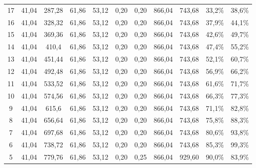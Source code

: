 \documentclass[letterpaper,11pt]{article} %
\begin{document}
\begin{itemize}
\begin{table}[H]
{\begin{tabular}{|c|cc|cc|cc|cc|cc|}
            17    & 41,04 & 287,28 & 61,86 & 53,12 & \cellcolor[rgb]{ .851,  .851,  .851}0,20 & \cellcolor[rgb]{ .851,  .851,  .851}0,20 & 866,04 & 743,68 & 33,2\% & 38,6\% \\
            16    & 41,04 & 328,32 & 61,86 & 53,12 & \cellcolor[rgb]{ .851,  .851,  .851}0,20 & \cellcolor[rgb]{ .851,  .851,  .851}0,20 & 866,04 & 743,68 & 37,9\% & 44,1\% \\
            15    & 41,04 & 369,36 & 61,86 & 53,12 & \cellcolor[rgb]{ .851,  .851,  .851}0,20 & \cellcolor[rgb]{ .851,  .851,  .851}0,20 & 866,04 & 743,68 & 42,6\% & 49,7\% \\
            14    & 41,04 & 410,4 & 61,86 & 53,12 & \cellcolor[rgb]{ .851,  .851,  .851}0,20 & \cellcolor[rgb]{ .851,  .851,  .851}0,20 & 866,04 & 743,68 & 47,4\% & 55,2\% \\
            13    & 41,04 & 451,44 & 61,86 & 53,12 & \cellcolor[rgb]{ .851,  .851,  .851}0,20 & \cellcolor[rgb]{ .851,  .851,  .851}0,20 & 866,04 & 743,68 & 52,1\% & 60,7\% \\
            12    & 41,04 & 492,48 & 61,86 & 53,12 & \cellcolor[rgb]{ .851,  .851,  .851}0,20 & \cellcolor[rgb]{ .851,  .851,  .851}0,20 & 866,04 & 743,68 & 56,9\% & 66,2\% \\
            11    & 41,04 & 533,52 & 61,86 & 53,12 & \cellcolor[rgb]{ .851,  .851,  .851}0,20 & \cellcolor[rgb]{ .851,  .851,  .851}0,20 & 866,04 & 743,68 & 61,6\% & 71,7\% \\
            10    & 41,04 & 574,56 & 61,86 & 53,12 & \cellcolor[rgb]{ .851,  .851,  .851}0,20 & \cellcolor[rgb]{ .851,  .851,  .851}0,20 & 866,04 & 743,68 & 66,3\% & 77,3\% \\
            9     & 41,04 & 615,6 & 61,86 & 53,12 & \cellcolor[rgb]{ .851,  .851,  .851}0,20 & \cellcolor[rgb]{ .851,  .851,  .851}0,20 & 866,04 & 743,68 & 71,1\% & 82,8\% \\
            8     & 41,04 & 656,64 & 61,86 & 53,12 & \cellcolor[rgb]{ .851,  .851,  .851}0,20 & \cellcolor[rgb]{ .851,  .851,  .851}0,20 & 866,04 & 743,68 & 75,8\% & 88,3\% \\
            7     & 41,04 & 697,68 & 61,86 & 53,12 & \cellcolor[rgb]{ .851,  .851,  .851}0,20 & \cellcolor[rgb]{ .851,  .851,  .851}0,20 & 866,04 & 743,68 & 80,6\% & 93,8\% \\
            6     & 41,04 & 738,72 & 61,86 & 53,12 & \cellcolor[rgb]{ .851,  .851,  .851}0,20 & \cellcolor[rgb]{ .851,  .851,  .851}0,20 & 866,04 & 743,68 & 85,3\% & 99,3\% \\
            5     & 41,04 & 779,76 & 61,86 & 53,12 & \cellcolor[rgb]{ .851,  .851,  .851}0,20 & \cellcolor[rgb]{ .682,  .667,  .667}0,25 & 866,04 & 929,60 & 90,0\% & 83,9\% \\

\end{tabular}}
\end{table}
\end{itemize}
\end{document}
